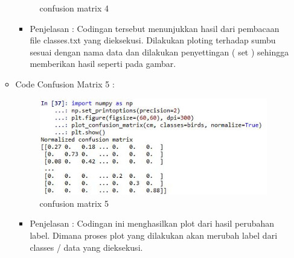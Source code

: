 \begin{enumerate}
\begin{itemize}
\begin{figure}[ht]
\caption{confusion matrix 4}
\label{contoh}
\end{figure}
\par
\begin{itemize}
\item Penjelasan : Codingan tersebut menunjukkan hasil dari pembacaan file classes.txt yang dieksekusi. Dilakukan ploting terhadap sumbu sesuai dengan nama data dan dilakukan penyettingan ( set ) sehingga memberikan hasil seperti pada gambar.
\par
\par
\end{itemize}
\item Code Confusion Matrix 5 :
\par
\begin{figure}[ht]
\centering
\includegraphics[scale=0.2]{figures/con5.jpg}
\caption{confusion matrix 5}
\label{contoh}
\end{figure}
\par
\begin{itemize}
\item Penjelasan : Codingan ini menghasilkan plot dari hasil perubahan label. Dimana proses plot yang dilakukan akan merubah label dari classes / data yang dieksekusi.
\par
\par
\end{itemize}

\end{itemize}


\end{enumerate}
